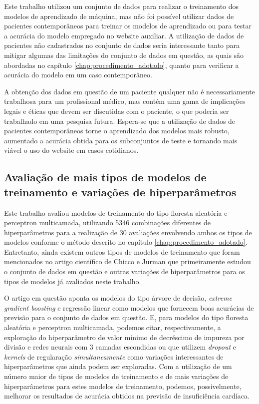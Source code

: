 Este trabalho utilizou um conjunto de dados\cite{larxel_dataset} para realizar o treinamento dos modelos de aprendizado de máquina, mas não foi possível utilizar dados de pacientes contemporâneos para treinar os modelos de aprendizado ou para testar a acurácia do modelo empregado no website auxiliar. A utilização de dados de pacientes não cadastrados no conjunto de dados seria interessante tanto para mitigar algumas das limitações do conjunto de dados em questão, as quais são abordadas no capítulo \ref{chap:procedimento_adotado}, quanto para verificar a acurácia do modelo em um caso contemporâneo.

A obtenção dos dados em questão de um paciente qualquer não é necessariamente trabalhosa para um profissional médico, mas contém uma gama de implicações legais e éticas que devem ser discutidas com o paciente, o que poderia ser trabalhado em uma pesquisa futura. Espera-se que a utilização de dados de pacientes contemporâneos torne o aprendizado dos modelos mais robusto, aumentado a acurácia obtida para os subconjuntos de teste e tornando mais viável o uso do website em casos cotidianos.

\subsection{Avaliação de mais tipos de modelos de treinamento e variações de hiperparâmetros}

Este trabalho avaliou modelos de treinamento do tipo floresta aleatória e perceptron multicamada, utilizando 5346 combinações diferentes de hiperparâmetros para a realização de 30 avaliações envolvendo ambos os tipos de modelos conforme o método descrito no capítulo \ref{chap:procedimento_adotado}. Entretanto, ainda existem outros tipos de modelos de treinamento que foram mencionados no artigo científico de Chicco e Jurman\cite{chicco2020} que primeiramente estudou o conjunto de dados em questão e outras variações de hiperparâmetros para os tipos de modelos já avaliados neste trabalho.

O artigo em questão aponta os modelos do tipo árvore de decisão, \textit{extreme gradient boosting} e regressão linear como modelos que fornecem boas acurácias de previsão para o conjunto de dados em questão. E, para modelos do tipo floresta aleatória e perceptron multicamada, podemos citar, respectivamente, a exploração do hiperparâmetro de valor mínimo de decréscimo de impureza por divisão e redes neurais com 3 camadas escondidas ou que utilizem \textit{dropout} e \textit{kernels} de regularação \textit{simultaneamente} como variações interessantes de hiperparâmetros que ainda podem ser exploradas. Com a utilização de um número maior de tipos de modelos de treinamento e de mais variações de hiperparâmetros para estes modelos de treinamento, podemos, possivelmente, melhorar os resultados de acurácia obtidos na previsão de insuficiência cardíaca.

